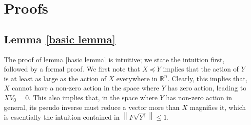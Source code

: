 \documentclass[11pt]{article}
\newcommand{\RR}{\mathbb{R}}
\newcommand{\norm}[1]{\left\|#1\right\|}
\newcommand{\Leq}{\preceq}
\begin{document}
\section{Proofs}
\subsection{Lemma \ref{basic lemma}}
The proof of lemma \ref{basic lemma} is intuitive; we state the intuition first, followed by a formal proof. We first note that $X \Leq Y$ implies that the action of $Y$ is at least as large as the action of $X$ everywhere in $\RR^n$. Clearly, this implies that, $X$ cannot have a non-zero action in the space where $Y$ has zero action, leading to $X V_0 = 0$. This also implies that, in the space where $Y$ has non-zero action in general, its pseudo inverse must reduce a vector more than $X$ magnifies it, which is essentially the intuition contained in $\norm{F \sqrt{Y^{\dagger}} } \leq 1$. 
\end{document}
